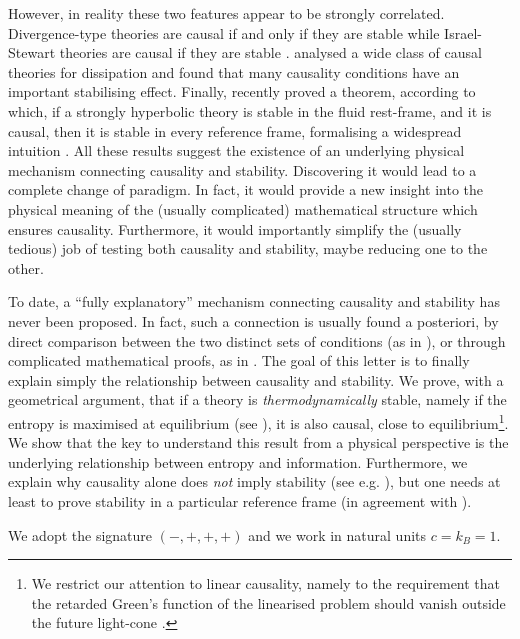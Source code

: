 \documentclass[aps,prl,reprint,nofootinbib]{revtex4-1}
\begin{document}
However, in reality these two features appear to be strongly correlated. Divergence-type theories are causal if and only if they are stable \cite{GerochLindblom1990} while Israel-Stewart theories are causal if they are stable \cite{Hishcock1983,OlsonLifsh1990}. \citet{Geroch_Lindblom_1991_causal} analysed a wide class of causal theories for dissipation and found that many causality conditions have an important stabilising effect. Finally, \citet{BemficaDNDefinitivo2020} recently proved a theorem, according to which, if a strongly hyperbolic theory is stable in the fluid rest-frame, and it is causal, then it is stable in every reference frame, formalising a widespread intuition \cite{DenicalStability2008,PuKoide2010}. All these results suggest the existence of an underlying physical mechanism connecting causality and stability. Discovering it would lead to a complete change of paradigm. In fact, it would provide a new insight into the physical meaning of the (usually complicated) mathematical structure which ensures causality. Furthermore, it would importantly simplify the (usually tedious) job of testing both causality and stability, maybe reducing one to the other. 

To date, a ``fully explanatory'' mechanism connecting causality and stability has never been proposed. In fact, such a connection is usually found a posteriori, by direct comparison between the two distinct sets of conditions (as in \cite{Hishcock1983}), or through complicated mathematical proofs, as in \cite{BemficaDNDefinitivo2020}. The goal of this letter is to finally explain simply the relationship between causality and stability. We prove, with a geometrical argument, that if a theory is \textit{thermodynamically} stable, namely if the entropy is maximised at equilibrium (see \citet{GavassinoGibbs2021}), it is also causal, close to equilibrium\footnote{We restrict our attention to linear causality, namely to the requirement that the retarded Green's function of the linearised problem should vanish outside the future light-cone \cite{Susskind1969}.}. We show that the key to understand this result from a physical perspective is the underlying relationship between entropy and information. Furthermore, we explain why causality alone does \textit{not} imply stability (see e.g. \cite{Susskind1969,MasoudHall2021}), but one needs at least to prove stability in a particular reference frame (in agreement with \cite{BemficaDNDefinitivo2020}). 

We adopt the signature $(-,+,+,+)$ and we work in natural units $c=k_B=1$.
\end{document}

